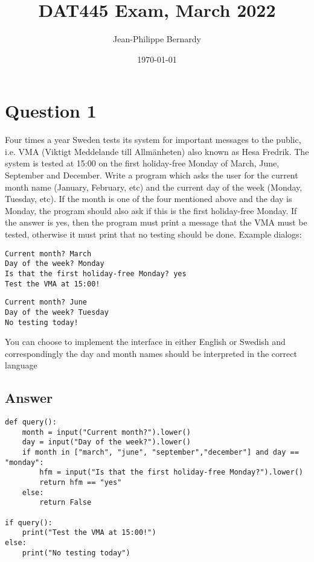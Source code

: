 \documentclass[11pt]{article}
\author{Jean-Philippe Bernardy}
\date{\today}
\title{DAT445 Exam, March 2022}
\begin{document}
\maketitle

\section{Question 1}
\label{sec:org8c3b1da}
Four times a year Sweden tests its system for important messages to the public, i.e. VMA (Viktigt
Meddelande till Allmänheten) also known as Hesa Fredrik. The system is tested at 15:00 on the
first holiday-free Monday of March, June, September and December.
Write a program which asks the user for the current month name (January, February, etc) and the
current day of the week (Monday, Tuesday, etc). If the month is one of the four mentioned above
and the day is Monday, the program should also ask if this is the first holiday-free Monday. If the
answer is yes, then the program must print a message that the VMA must be tested, otherwise it
must print that no testing should be done.
Example dialogs:

\begin{verbatim}
Current month? March
Day of the week? Monday
Is that the first holiday-free Monday? yes
Test the VMA at 15:00!
\end{verbatim}

\begin{verbatim}
Current month? June
Day of the week? Tuesday
No testing today!
\end{verbatim}

You can choose to implement the interface in either English or Swedish and correspondingly the
day and month names should be interpreted in the correct language

\subsection{Answer}
\label{sec:org21ba196}

\begin{verbatim}
def query():
    month = input("Current month?").lower()
    day = input("Day of the week?").lower()
    if month in ["march", "june", "september","december"] and day == "monday":
        hfm = input("Is that the first holiday-free Monday?").lower()
        return hfm == "yes"
    else:
        return False

if query():
    print("Test the VMA at 15:00!")
else:
    print("No testing today")
\end{verbatim}
\end{document}
